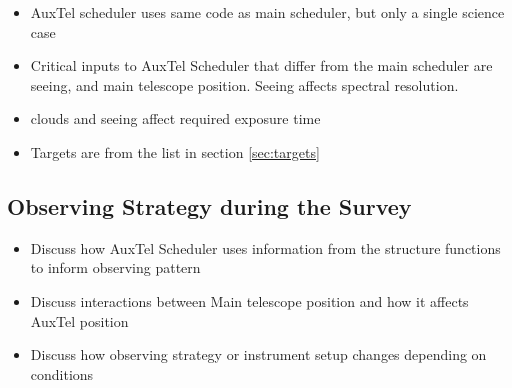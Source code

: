 \begin{itemize}
	\item AuxTel scheduler uses same code as main scheduler, but only a single science case
	\item Critical inputs to AuxTel Scheduler that differ from the main scheduler are seeing, and main telescope position. Seeing affects spectral resolution. 
	\item clouds and seeing affect required exposure time
	\item Targets are from the list in section \ref{sec:targets}
\end{itemize}

\subsection{Observing Strategy during the Survey}
\begin{itemize}
	\item Discuss how AuxTel Scheduler uses information from the structure functions to inform observing pattern
	\item Discuss interactions between Main telescope position and how it affects AuxTel position
	\item Discuss how observing strategy or instrument setup changes depending on conditions
\end{itemize}
